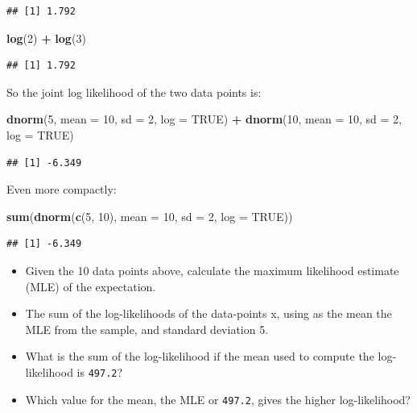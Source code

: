\documentclass[12pt,]{krantz}
\newenvironment{Shaded}{\begin{snugshade}}{\end{snugshade}}
\newcommand{\DataTypeTok}[1]{\textcolor[rgb]{0.13,0.29,0.53}{#1}}
\newcommand{\DecValTok}[1]{\textcolor[rgb]{0.00,0.00,0.81}{#1}}
\newcommand{\KeywordTok}[1]{\textcolor[rgb]{0.13,0.29,0.53}{\textbf{#1}}}
\newcommand{\NormalTok}[1]{#1}
\newcommand{\OperatorTok}[1]{\textcolor[rgb]{0.81,0.36,0.00}{\textbf{#1}}}
\newcommand{\OtherTok}[1]{\textcolor[rgb]{0.56,0.35,0.01}{#1}}
\newcommand{\StringTok}[1]{\textcolor[rgb]{0.31,0.60,0.02}{#1}}
\providecommand{\tightlist}{%
  \setlength{\itemsep}{0pt}\setlength{\parskip}{0pt}}
\begin{document}
\begin{verbatim}
## [1] 1.792
\end{verbatim}

\begin{Shaded}
\begin{Highlighting}[]
\KeywordTok{log}\NormalTok{(}\DecValTok{2}\NormalTok{) }\OperatorTok{+}\StringTok{ }\KeywordTok{log}\NormalTok{(}\DecValTok{3}\NormalTok{)}
\end{Highlighting}
\end{Shaded}

\begin{verbatim}
## [1] 1.792
\end{verbatim}

So the joint log likelihood of the two data points is:

\begin{Shaded}
\begin{Highlighting}[]
\KeywordTok{dnorm}\NormalTok{(}\DecValTok{5}\NormalTok{, }\DataTypeTok{mean =} \DecValTok{10}\NormalTok{, }\DataTypeTok{sd =} \DecValTok{2}\NormalTok{, }\DataTypeTok{log =} \OtherTok{TRUE}\NormalTok{) }\OperatorTok{+}\StringTok{ }
\StringTok{  }\KeywordTok{dnorm}\NormalTok{(}\DecValTok{10}\NormalTok{, }\DataTypeTok{mean =} \DecValTok{10}\NormalTok{, }\DataTypeTok{sd =} \DecValTok{2}\NormalTok{, }\DataTypeTok{log =} \OtherTok{TRUE}\NormalTok{)}
\end{Highlighting}
\end{Shaded}

\begin{verbatim}
## [1] -6.349
\end{verbatim}

Even more compactly:

\begin{Shaded}
\begin{Highlighting}[]
\KeywordTok{sum}\NormalTok{(}\KeywordTok{dnorm}\NormalTok{(}\KeywordTok{c}\NormalTok{(}\DecValTok{5}\NormalTok{, }\DecValTok{10}\NormalTok{), }\DataTypeTok{mean =} \DecValTok{10}\NormalTok{, }\DataTypeTok{sd =} \DecValTok{2}\NormalTok{, }\DataTypeTok{log =} \OtherTok{TRUE}\NormalTok{))}
\end{Highlighting}
\end{Shaded}

\begin{verbatim}
## [1] -6.349
\end{verbatim}

\begin{itemize}
\tightlist
\item
  Given the 10 data points above, calculate the maximum likelihood estimate (MLE) of the expectation.
\item
  The sum of the log-likelihoods of the data-points x, using as the mean the MLE from the sample, and standard deviation 5.
\item
  What is the sum of the log-likelihood if the mean used to compute the log-likelihood is \texttt{497.2}?
\item
  Which value for the mean, the MLE or \texttt{497.2}, gives the higher log-likelihood?
\end{itemize}
\end{document}
